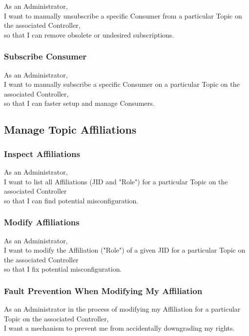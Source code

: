 As an Administrator, \\
I want to manually unsubscribe a specific Consumer from a particular Topic on the associated Controller, \\
so that I can remove obsolete or undesired subscriptions.

\subsubsection{Subscribe Consumer}

As an Administrator, \\
I want to manually subscribe a specific Consumer on a particular Topic on the associated Controller, \\
so that I can faster setup and manage Consumers.

\subsection{Manage Topic Affiliations}
\subsubsection{Inspect Affiliations}

As an Administrator,\\
I want to list all Affiliations (JID and "Role") for a particular Topic on the associated Controller \\
so that I can find potential misconfiguration.

\subsubsection{Modify Affiliations}

As an Administrator,\\
I want to modify the Affiliation ("Role") of a given JID for a particular Topic on the associated Controller \\
so that I fix potential misconfiguration.

\subsubsection{Fault Prevention When Modifying My Affiliation}

As an Administrator in the process of modifying my Affiliation for a particular Topic on the associated Controller,\\
I want a mechanism to prevent me from accidentally downgrading my rights.

